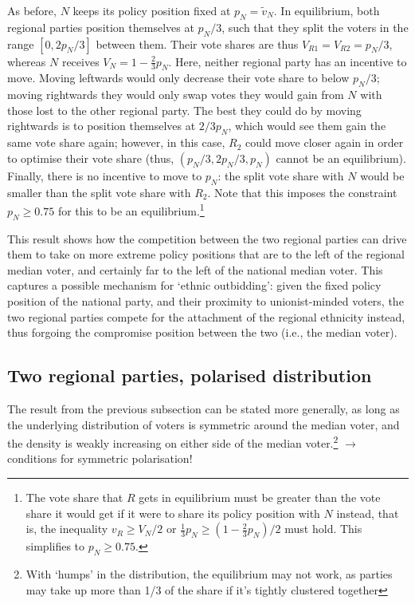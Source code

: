 \documentclass[11pt]{article}
\begin{document}
As before, $N$ keeps its policy position fixed at $p_N = \tilde{v}_N$. In equilibrium, both regional parties position themselves at $p_N / 3$, such that they split the voters in the range $[0, 2 p_N/3]$ between them. Their vote shares are thus $V_{R1} = V_{R2} = p_N / 3$, whereas $N$ receives $V_N = 1 - \frac{2}{3} p_N$. Here, neither regional party has an incentive to move. Moving leftwards would only decrease their vote share to below $p_N / 3$; moving rightwards they would only swap votes they would gain from $N$ with those lost to the other regional party. The best they could do by moving rightwards is to position themselves at $2/3 p_N$, which would see them gain the same vote share again; however, in this case, $R_2$ could move closer again in order to optimise their vote share (thus, $(p_N / 3, 2 p_N/3, p_N) $ cannot be an equilibrium). Finally, there is no incentive to move to $p_N$: the split vote share with $N$ would be smaller than the split vote share with $R_2$. Note that this imposes the constraint $p_N \geq 0.75$ for this to be an equilibrium.\footnote{The vote share that $R$ gets in equilibrium must be greater than the vote share it would get if it were to share its policy position with $N$ instead, that is, the inequality $v_R \geq V_N / 2$ or $\frac{1}{3} p_N \geq (1 - \frac{2}{3} p_N) / 2$ must hold. This simplifies to $p_N \geq 0.75$.}

This result shows how the competition between the two regional parties can drive them to take on more extreme policy positions that are to the left of the regional median voter, and certainly far to the left of the national median voter. This captures a possible mechanism for `ethnic outbidding': given the fixed policy position of the national party, and their proximity to unionist-minded voters, the two regional parties compete for the attachment of the regional ethnicity instead, thus forgoing the compromise position between the two (i.e., the median voter).

\subsection{Two regional parties, polarised distribution}

The result from the previous subsection can be stated more generally, as long as the underlying distribution of voters is symmetric around the median voter, and the density is weakly increasing on either side of the median voter.\footnote{With `humps' in the distribution, the equilibrium may not work, as parties may take up more than 1/3 of the share if it's tightly clustered together} $\rightarrow$ conditions for symmetric polarisation!
\end{document}
